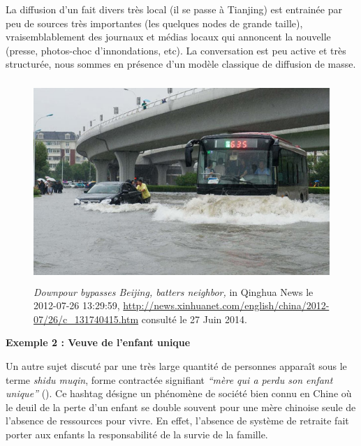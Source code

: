 La diffusion d{\textquoteright}un fait divers très local (il se passe à Tianjing) est entrainée par peu de sources très importantes (les quelques nodes de grande taille), vraisemblablement des journaux et médias locaux qui annoncent la nouvelle (presse, photos-choc d{\textquoteright}innondations, etc). La conversation est peu active et très structurée, nous sommes en présence d{\textquoteright}un modèle classique de diffusion de masse.

\begin{figure}[h!]
    \centering
    \includegraphics[width=4.76in,height=3in]{figures/chap3/chapitre3-img16.jpg}
    \caption[Photo de Tianjin durant la pluie torentielle en Juillet 2012]{\textit{Downpour bypasses Beijing, batters neighbor, }in Qinghua News le 2012-07-26 13:29:59, \url{http://news.xinhuanet.com/english/china/2012-07/26/c_131740415.htm} consulté le 27 Juin 2014.}
\end{figure}

\textbf{Exemple 2 : Veuve de l{\textquoteright}enfant unique}

Un autre sujet discuté par une très large quantité de personnes appara\^it sous le terme {\textquotedbl}\textit{shidu muqin}{\textquotedbl}, forme contractée signifiant \textit{{\textquotedblleft}mère qui a perdu son enfant unique{\textquotedblright}} (). Ce hashtag désigne un phénomène de société bien connu en Chine o\`u le deuil de la perte d{\textquoteright}un enfant se double souvent pour une mère chinoise seule de l{\textquoteright}absence de ressources pour vivre. En effet, l{\textquoteright}absence de système de retraite fait porter aux enfants la responsabilité de la survie de la famille.

